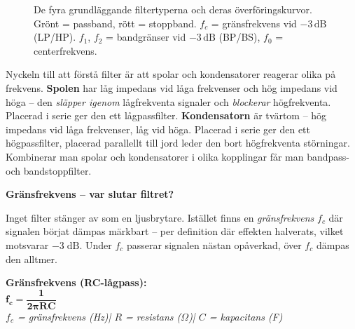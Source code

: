 \documentclass[a4paper,11pt,twoside]{book}
\begin{document}
\begin{figure}[h]
\caption{De fyra grundläggande filtertyperna och deras överföringskurvor.
Grönt = passband, rött = stoppband. $f_c$ = gränsfrekvens vid $-3\,\text{dB}$
(LP/HP). $f_1$, $f_2$ = bandgränser vid $-3\,\text{dB}$ (BP/BS),
$f_0$ = centerfrekvens.}
\label{fig:filtertyper}
\end{figure}

Nyckeln till att förstå filter är att spolar och kondensatorer
reagerar olika på frekvens. \textbf{Spolen} har låg impedans vid
låga frekvenser och hög impedans vid höga -- den \emph{släpper igenom}
lågfrekventa signaler och \emph{blockerar} högfrekventa. Placerad i
serie ger den ett lågpassfilter. \textbf{Kondensatorn} är tvärtom --
hög impedans vid låga frekvenser, låg vid höga. Placerad i serie ger
den ett högpassfilter, placerad parallellt till jord leder den bort
högfrekventa störningar. Kombinerar man spolar och kondensatorer i
olika kopplingar får man bandpass- och bandstoppfilter.

\medskip
\noindent\textbf{Gränsfrekvens -- var slutar filtret?}
\medskip

Inget filter stänger av som en ljusbrytare. Istället finns en
\emph{gränsfrekvens} $f_c$ där signalen börjat dämpas märkbart --
per definition där effekten halverats, vilket motsvarar
$-3\;\text{dB}$. Under $f_c$ passerar signalen nästan opåverkad,
över $f_c$ dämpas den alltmer.

\begin{formulabox}
\textbf{Gränsfrekvens (RC-lågpass):}\\[2mm]
{\large$\mathbf{f_c = \dfrac{1}{2\pi RC}}$}\\[3mm]
{\small\normalfont\itshape
$f_c$ = gränsfrekvens (Hz)\quad|\quad
$R$ = resistans ($\Omega$)\quad|\quad
$C$ = kapacitans (F)}
\end{formulabox}

\end{document}
